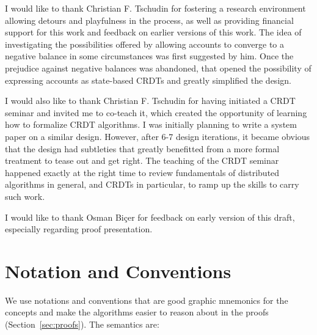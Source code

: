 \documentclass[9pt, oneside]{article}   	%
\begin{document}
I would like to thank Christian F. Tschudin for fostering a research environment allowing detours and playfulness in the process, as well as providing financial support for this work and feedback on earlier versions of this work. The idea of investigating the possibilities offered by allowing accounts to converge to a negative balance in some circumstances was first suggested by him. Once the prejudice against negative balances was abandoned, that opened the possibility of expressing accounts as state-based CRDTs and greatly simplified the design.

I would also like to thank Christian F. Tschudin for having initiated a CRDT seminar and invited me to co-teach it, which created the opportunity of learning how to formalize CRDT algorithms. I was initially planning to write a system paper on a similar design. However, after 6-7 design iterations, it became obvious that the design had subtleties that greatly benefitted from a more formal treatment to tease out and get right. The teaching of the CRDT seminar happened exactly at the right time to review fundamentals of distributed algorithms in general, and CRDTs in particular, to ramp up the skills to carry such work.

I would like to thank Osman Biçer for feedback on early version of this draft, especially regarding proof presentation.



\newpage




\newpage
\appendix




\section{Notation and Conventions}
\label{apdx:notation}

We use notations and conventions that are good graphic mnemonics for the concepts and make the algorithms easier to reason about in the proofs (Section~\ref{sec:proofs}). The semantics are:
\end{document}
